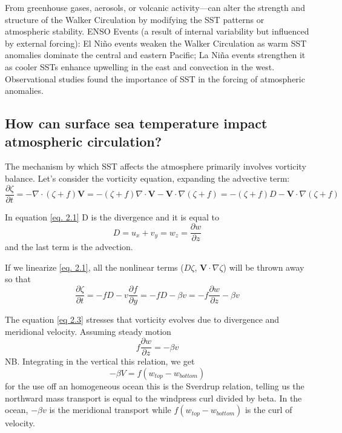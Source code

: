 From greenhouse gases, aerosols, or volcanic activity—can alter the strength and structure of the Walker Circulation by modifying the SST patterns or atmospheric stability. 
ENSO Events (a result of internal variability but influenced by external forcing): El Niño events weaken the Walker Circulation as warm SST anomalies dominate the central and eastern Pacific; La Niña events strengthen it as cooler SSTs enhance upwelling in the east and convection in the west.
Observational studies found the importance of SST in the forcing of atmospheric anomalies. 


\subsection{How can surface sea temperature impact atmospheric circulation?} 
The mechanism by which SST affects the atmosphere primarily involves vorticity balance.
Let's consider the vorticity equation, expanding the advective term: 
\begin{equation}\label{eq. 2.1}
    \frac{\partial \zeta}{\partial t} = - \nabla \cdot (\zeta + f) \mathbf{V} = - (\zeta + f) \nabla \cdot \mathbf{V} - \mathbf{V} \cdot \nabla (\zeta + f) = - (\zeta + f) D - \mathbf{V} \cdot \nabla (\zeta + f)
\end{equation}

In equation \ref{eq. 2.1} D is the divergence and it is equal to 
\begin{equation}
    D=u_x + v_y = w_z = \frac{\partial w}{\partial z} 
\end{equation}
and the last term is the advection. 


If we linearize \ref{eq. 2.1}, all the nonlinear terms ($D\zeta$, $\mathbf{V}\cdot\nabla\zeta$) will be thrown away so that 
  \begin{equation}\label{eq 2.3}
    \frac{\partial \zeta}{\partial t} = - f D - v \frac{\partial f}{\partial y} = - f D - \beta v=- f \frac{\partial w}{\partial z} - \beta v
\end{equation}

The equation \ref{eq 2.3} stresses that vorticity evolves due to divergence and meridional velocity. 
Assuming steady motion 
\begin{equation}
    f \frac{\partial w}{\partial z} = -\beta v
\end{equation}
NB. Integrating in the vertical this relation, we get $$-\beta V=f(w_{top}-w_{bottom})$$
for the use off an homogeneous ocean this is the Sverdrup relation, telling us the northward mass transport is equal to the windpress curl divided by beta. In the ocean, $-\beta v$ is the meridional transport while $f(w_{top}-w_{bottom})$ is the curl of velocity.\\



